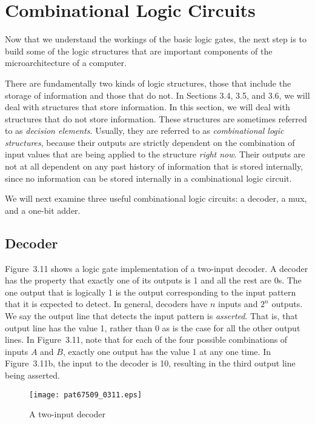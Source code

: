 \documentclass{patt}
\begin{document}
\FloatBarrier
\section{Combinational Logic Circuits}

Now that we understand the workings of the basic logic gates, the next
step is to build some of the logic structures that are important
components of the microarchitecture of a computer.

There are fundamentally two kinds of logic structures, those that
include the storage of information and those that do not.  In Sections
3.4, 3.5, and 3.6, we will deal with structures that store
information.  In this section, we will deal with structures that do not
store information.
These structures are sometimes referred to as {\em decision elements}.
Usually, they are referred to as {\em combinational logic structures},
because their outputs are strictly dependent on the combination of
input values that are being applied to the structure {\em right now}.
Their outputs are not at all dependent on any past history of
information that is stored internally, since no information can be
stored internally in a combinational logic circuit.

We will next examine three useful combinational logic circuits: a decoder, 
a mux, and a one-bit adder.

\subsection{Decoder}

 Figure~3.11 shows a logic gate implementation of a two-input
decoder.  A decoder has the property that exactly one of its outputs
is 1 and all the rest are 0s.  The one output that is logically 1 is
the output corresponding to the input pattern that it is expected to
detect.  In general, decoders have $n$ inputs and $2^n$ outputs.  We
say the output line that detects the input pattern is {\em asserted}.
That is, that output  line has the value 1, rather
than 0 as is the case for all the other output lines.  In Figure~3.11,
note that for each of the four possible combinations of inputs $A$ and
$B$, exactly one output has the value 1 at any one time.  In \nobreak
Figure~3.11b, the input to the decoder is 10, resulting in the third
output line being asserted.

\begin{figure}
\centerline{\texttt{[image: pat67509\_0311.eps]}}
\caption{A two-input decoder}
\label{fig:decoder}
\end{figure}
\end{document}

